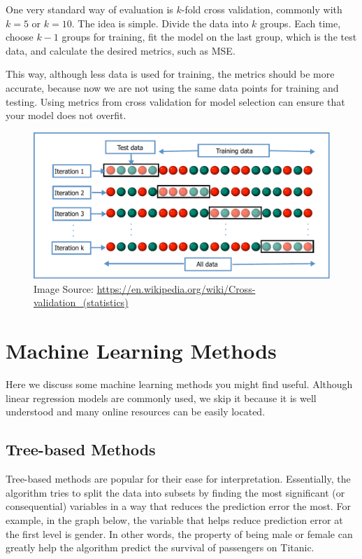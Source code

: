 \documentclass[
]{book}
\begin{document}
One very standard way of evaluation is \(k\)-fold cross validation, commonly with \(k=5\) or \(k=10\). The idea is simple. Divide the data into \(k\) groups. Each time, choose \(k-1\) groups for training, fit the model on the last group, which is the test data, and calculate the desired metrics, such as MSE.

This way, although less data is used for training, the metrics should be more accurate, because now we are not using the same data points for training and testing. Using metrics from cross validation for model selection can ensure that your model does not overfit.

\begin{figure}
\centering
\includegraphics{images/K-fold_cross_validation_EN.pdf}
\caption{\label{fig:unnamed-chunk-8}Image Source: \url{https://en.wikipedia.org/wiki/Cross-validation_(statistics)}}
\end{figure}

\hypertarget{machine-learning-methods}{%
\chapter{Machine Learning Methods}\label{machine-learning-methods}}

Here we discuss some machine learning methods you might find useful. Although linear regression models are commonly used, we skip it because it is well understood and many online resources can be easily located.

\hypertarget{tree-based-methods}{%
\section{Tree-based Methods}\label{tree-based-methods}}

Tree-based methods are popular for their ease for interpretation. Essentially, the algorithm tries to split the data into subsets by finding the most significant (or consequential) variables in a way that reduces the prediction error the most. For example, in the graph below, the variable that helps reduce prediction error at the first level is gender. In other words, the property of being male or female can greatly help the algorithm predict the survival of passengers on Titanic.
\end{document}
